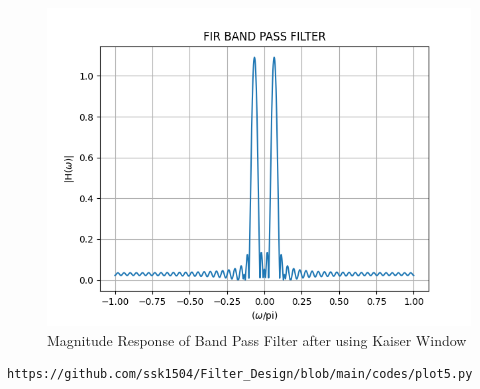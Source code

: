 \documentclass{article}
\begin{document}
\begin{figure}[H]
\centering
\includegraphics[width=1\columnwidth]{figs/FIR_Bandpass_Filter.png}
\caption{Magnitude Response of Band Pass Filter after using Kaiser Window}
\label{fig:Kaiser_BPF_response}
\end{figure}
\begin{lstlisting}
https://github.com/ssk1504/Filter_Design/blob/main/codes/plot5.py
\end{lstlisting}
\end{document}
